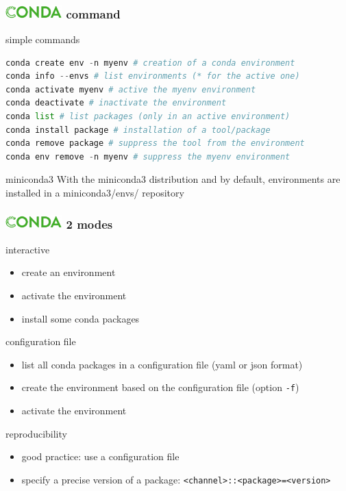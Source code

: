 \begin{frame}[containsverbatim]
\frametitle{\includegraphics[height=0.5cm]{shared/logo-conda.png} command}
\begin{block}{simple commands}
\begin{lstlisting}[language=python]
conda create env -n myenv # creation of a conda environment 
conda info --envs # list environments (* for the active one) 
conda activate myenv # active the myenv environment
conda deactivate # inactivate the environment
conda list # list packages (only in an active environment)
conda install package # installation of a tool/package
conda remove package # suppress the tool from the environment
conda env remove -n myenv # suppress the myenv environment
\end{lstlisting}
\end{block}
\begin{block}{miniconda3}
With the miniconda3 distribution and by default, environments are installed in a miniconda3/envs/ repository
\end{block}
\end{frame}
\begin{frame}[containsverbatim]
\frametitle{\includegraphics[height=0.5cm]{shared/logo-conda.png} 2 modes}
\begin{block}{interactive}
\begin{itemize}
    \item create an environment
    \item activate the environment
    \item install some conda packages
\end{itemize}
\end{block}
\begin{block}{configuration file}
\begin{itemize}
    \item list all conda packages in a configuration file (yaml or json format)
    \item create the environment based on the configuration file (option \verb|-f|)
    \item activate the environment
\end{itemize}
\end{block}
\begin{block}{reproducibility}
\begin{itemize}
    \item good practice: use a configuration file
    \item specify a precise version of a package:  \verb|<channel>::<package>=<version>| 
\end{itemize}
\end{block}
\end{frame}